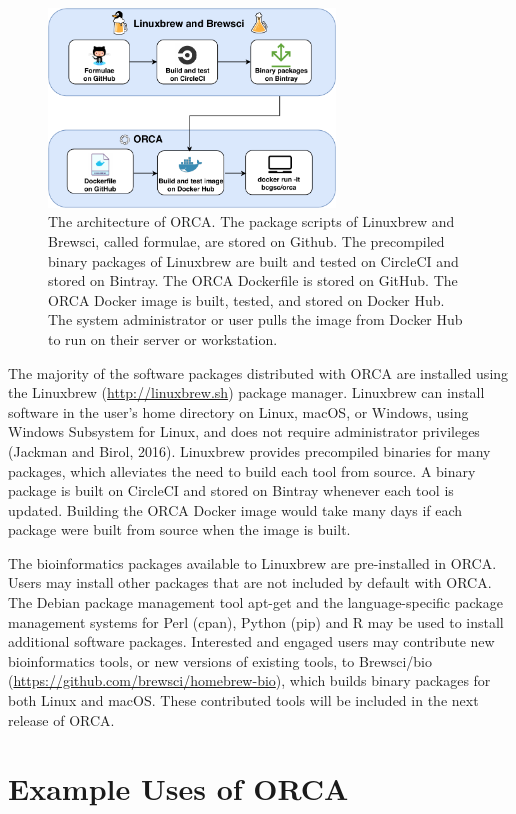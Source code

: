 \documentclass{bioinfo}
\begin{document}
\begin{figure}[b]
\centering
\includegraphics[width=3in]{figures/architecture.pdf}
\caption{The architecture of ORCA. The package scripts of Linuxbrew and Brewsci, called formulae, are stored on Github. The precompiled binary packages of Linuxbrew are built and tested on CircleCI and stored on Bintray. The ORCA Dockerfile is stored on GitHub. The ORCA Docker image is built, tested, and stored on Docker Hub. The system administrator or user pulls the image from Docker Hub to run on their server or workstation.}
\label{fig:orca}
\end{figure}

The majority of the software packages distributed with ORCA are installed using the Linuxbrew (\url{http://linuxbrew.sh}) package manager. Linuxbrew can install software in the user's home directory on Linux, macOS, or Windows, using Windows Subsystem for Linux, and does not require administrator privileges (Jackman and Birol, 2016). Linuxbrew provides precompiled binaries for many packages, which alleviates the need to build each tool from source. A binary package is built on CircleCI and stored on Bintray whenever each tool is updated. Building the ORCA Docker image would take many days if each package were built from source when the image is built.

The bioinformatics packages available to Linuxbrew are pre-installed in ORCA. Users may install other packages that are not included by default with ORCA. The Debian package management tool apt-get and the language-specific package management systems for Perl (cpan), Python (pip) and R may be used to install additional software packages. Interested and engaged users may contribute new bioinformatics tools, or new versions of existing tools, to Brewsci/bio (\url{https://github.com/brewsci/homebrew-bio}), which builds binary packages for both Linux and macOS. These contributed tools will be included in the next release of ORCA.

\section{Example Uses of ORCA}
\end{document}
